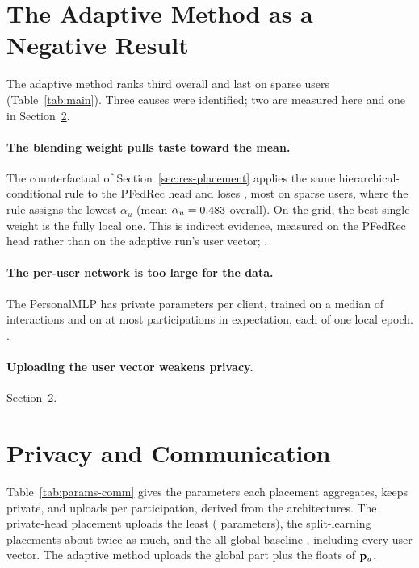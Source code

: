 \section{The Adaptive Method as a Negative Result}
\label{sec:res-adaptive}

The adaptive method ranks third overall and last on sparse users (Table~\ref{tab:main}). Three
causes were identified; two are measured here and one in Section~\ref{sec:res-privacy}.

\paragraph{The blending weight pulls taste toward the mean.} The counterfactual of
Section~\ref{sec:res-placement} applies the same hierarchical-conditional rule to the PFedRec
head and loses \AbsDeltaHeadAlphaPolicyHc{} \ndcg{}, most on sparse users, where the rule assigns
the lowest $\alpha_u$ (mean $\alpha_u = 0.483$ overall). On the grid, the best single
weight is the fully local one. This is indirect evidence, measured on the PFedRec head rather
than on the adaptive run's user vector; .

\paragraph{The per-user network is too large for the data.} The PersonalMLP has
\ParamsPersonalMlp{} private parameters per client, trained on a median of \DsMedianRatings{}
interactions and on at most \ExpectedParticipations{} participations in expectation, each of
one local epoch. .

\paragraph{Uploading the user vector weakens privacy.} Section~\ref{sec:res-privacy}.

\section{Privacy and Communication}
\label{sec:res-privacy}

Table~\ref{tab:params-comm} gives the parameters each placement aggregates, keeps private, and
uploads per participation, derived from the architectures. The private-head placement uploads
the least (\ParamsPfedrecGlobal{} parameters), the split-learning placements about twice as
much, and the all-global baseline \ParamsBaselineGlobal, including every user vector. The
adaptive method uploads the global part plus the \ParamsAdaptiveUploadExtra{} floats of $\mathbf{p}_u$.

